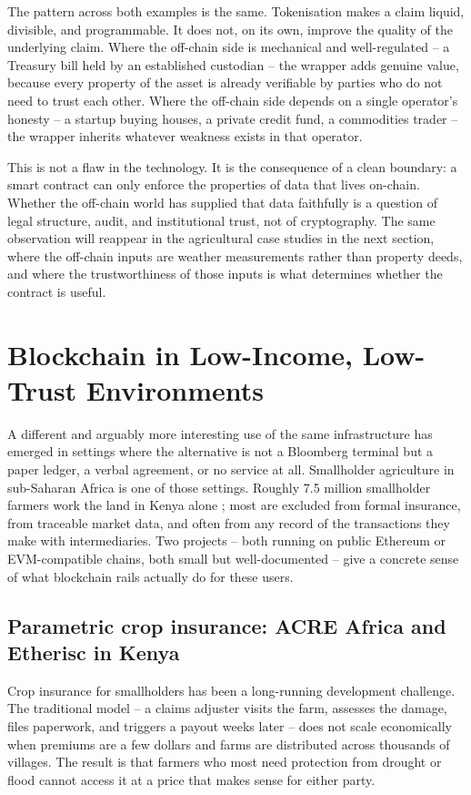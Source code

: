 The pattern across both examples is the same. Tokenisation makes a claim
liquid, divisible, and programmable. It does not, on its own, improve the
quality of the underlying claim. Where the off-chain side is mechanical
and well-regulated -- a Treasury bill held by an established custodian --
the wrapper adds genuine value, because every property of the asset is
already verifiable by parties who do not need to trust each other. Where
the off-chain side depends on a single operator's honesty -- a startup
buying houses, a private credit fund, a commodities trader -- the wrapper
inherits whatever weakness exists in that operator.

This is not a flaw in the technology. It is the consequence of a clean
boundary: a smart contract can only enforce the properties of data that
lives on-chain. Whether the off-chain world has supplied that data
faithfully is a question of legal structure, audit, and institutional
trust, not of cryptography. The same observation will reappear in the
agricultural case studies in the next section, where the off-chain inputs
are weather measurements rather than property deeds, and where the
trustworthiness of those inputs is what determines whether the contract is
useful.

\section{Blockchain in Low-Income, Low-Trust Environments}

A different and arguably more interesting use of the same infrastructure
has emerged in settings where the alternative is not a Bloomberg terminal
but a paper ledger, a verbal agreement, or no service at all. Smallholder
agriculture in sub-Saharan Africa is one of those settings. Roughly 7.5
million smallholder farmers work the land in Kenya alone
\cite{etheriscLcc2023}; most are excluded from formal insurance, from
traceable market data, and often from any record of the transactions they
make with intermediaries. Two projects -- both running on public Ethereum
or EVM-compatible chains, both small but well-documented -- give a
concrete sense of what blockchain rails actually do for these users.

\subsection{Parametric crop insurance: ACRE Africa and Etherisc in Kenya}

Crop insurance for smallholders has been a long-running development
challenge. The traditional model -- a claims adjuster visits the farm,
assesses the damage, files paperwork, and triggers a payout weeks later --
does not scale economically when premiums are a few dollars and farms are
distributed across thousands of villages. The result is that farmers who
most need protection from drought or flood cannot access it at a price
that makes sense for either party.

